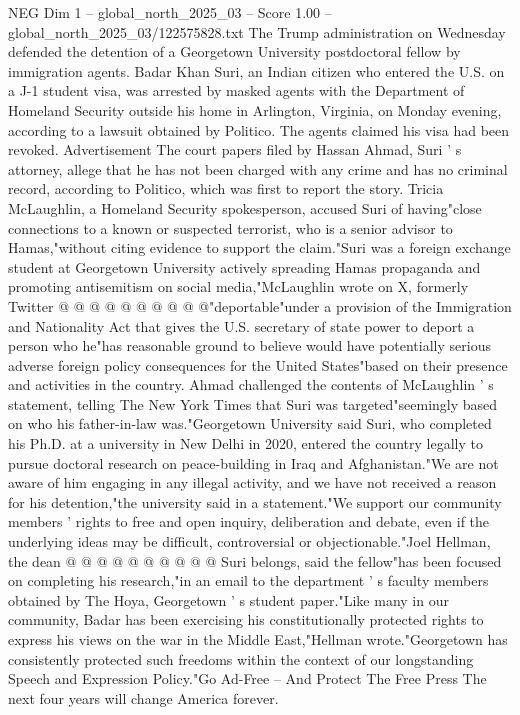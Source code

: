 \begin{textsample}{NEG Dim 1 – global\_north\_2025\_03 – Score 1.00 – global\_north\_2025\_03/122575828.txt}  \label{ex:f1_neg_058}
The Trump administration on Wednesday defended the detention of a Georgetown University postdoctoral fellow by immigration agents.
Badar Khan Suri, an Indian citizen who entered the U.S. on a J-1 student visa, was arrested by masked agents with the Department of Homeland Security outside his home in Arlington, Virginia, on Monday evening, according to a lawsuit obtained by Politico.
The agents claimed his visa had been revoked.
Advertisement The court papers filed by Hassan Ahmad, Suri ' s attorney, allege that he has not been charged with any crime and has no criminal record, according to Politico, which was first to report the story.
Tricia McLaughlin, a Homeland Security spokesperson, accused Suri of having"close connections to a known or suspected terrorist, who is a senior advisor to Hamas,"without citing evidence to support the claim."Suri was a foreign exchange student at Georgetown University actively spreading Hamas propaganda and promoting antisemitism on social media,"McLaughlin wrote on X, formerly Twitter @ @ @ @ @ @ @ @ @ @"deportable"under a provision of the Immigration and Nationality Act that gives the U.S. secretary of state power to deport a person who he"has reasonable ground to believe would have potentially serious adverse foreign policy consequences for the United States"based on their presence and activities in the country.
Ahmad challenged the contents of McLaughlin ' s statement, telling The New York Times that Suri was targeted"seemingly based on who his father-in-law was."Georgetown University said Suri, who completed his Ph.D. at a university in New Delhi in 2020, entered the country legally to pursue doctoral research on peace-building in Iraq and Afghanistan."We are not aware of him engaging in any illegal activity, and we have not received a reason for his detention,"the university said in a statement."We support our community members ' rights to free and open inquiry, deliberation and debate, even if the underlying ideas may be difficult, controversial or objectionable."Joel Hellman, the dean @ @ @ @ @ @ @ @ @ @ Suri belongs, said the fellow"has been focused on completing his research,"in an email to the department ' s faculty members obtained by The Hoya, Georgetown ' s student paper."Like many in our community, Badar has been exercising his constitutionally protected rights to express his views on the war in the Middle East,"Hellman wrote."Georgetown has consistently protected such freedoms within the context of our longstanding Speech and Expression Policy."Go Ad-Free -- And Protect The Free Press The next four years will change America forever.

\end{textsample}
